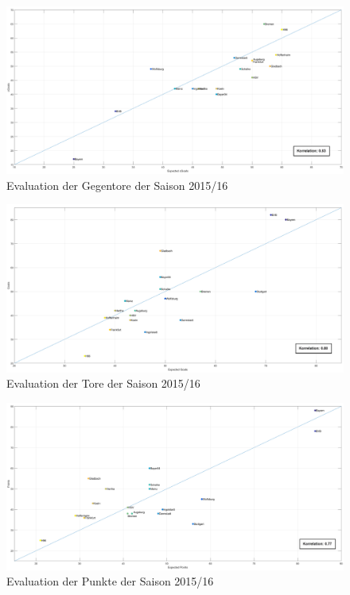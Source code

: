 \begin{figure}
\centering
\includegraphics[scale=0.3]{se-wa-jpg/cGoals_correlation_15_16}
\caption{Evaluation der Gegentore der Saison 2015/16}
\label{lines}
\end{figure}

\begin{figure}
\centering
\includegraphics[scale=0.3]{se-wa-jpg/goals_correlation_15_16}
\caption{Evaluation der Tore der Saison 2015/16}
\label{lines}
\end{figure}

\begin{figure}
\centering
\includegraphics[scale=0.3]{se-wa-jpg/points_correlation_15_16}
\caption{Evaluation der Punkte der Saison 2015/16}
\label{lines}
\end{figure}

